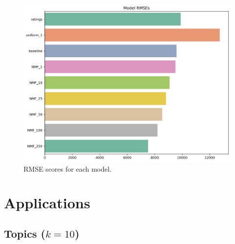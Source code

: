 \documentclass[handout]{beamer}
\begin{document}
\begin{frame}
 
\begin{figure}[h]
    \includegraphics[width=0.8\linewidth]{../image/goodreads-models/model-rmses.png}
    \caption[RMSE Comparison]{RMSE scores for each model.}
     \label{fig:rmse}
\end{figure}
\end{frame}

\section{Applications}

\subsection{Topics ($k=10$)}
\end{document}
